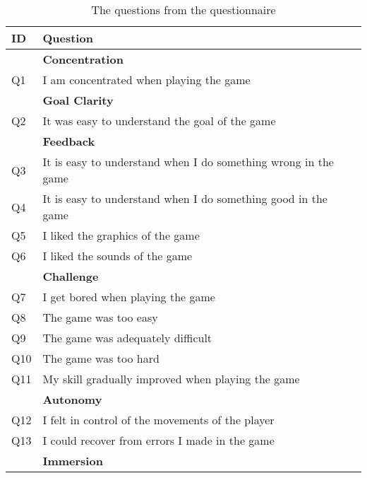 \begin{table}[]
	\centering
	\caption{The questions from the questionnaire}
	\label{tab:questions}
	\begin{tabular}{|l|l|}
		\hline
		\textbf{ID} & \textbf{Question}                                              \\ \hline
					& \textbf{Concentration}                                         \\ \hline
		Q1          & I am concentrated when playing the game                        \\ \hline
					& \textbf{Goal Clarity}                                          \\ \hline
		Q2          & It was easy to understand the goal of the game                 \\ \hline
					& \textbf{Feedback}                                              \\ \hline
		Q3          & It is easy to understand when I do something wrong in the game \\
		Q4          & It is easy to understand when I do something good in the game  \\
		Q5          & I liked the graphics of the game                               \\
		Q6          & I liked the sounds of the game                                 \\ \hline
					& \textbf{Challenge}                                             \\ \hline
		Q7          & I get bored when playing the game                              \\
		Q8          & The game was too easy                                          \\
		Q9          & The game was adequately difficult                              \\
		Q10         & The game was too hard                                          \\
		Q11         & My skill gradually improved when playing the game              \\ \hline
					& \textbf{Autonomy}                                              \\ \hline
		Q12         & I felt in control of the movements of the player               \\
		Q13         & I could recover from errors I made in the game                 \\ \hline
					& \textbf{Immersion}                                             \\ \hline

\end{tabular}
\end{table}
